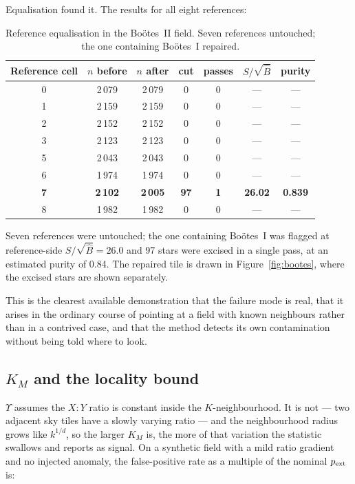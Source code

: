 \documentclass[11pt,a4paper]{article}
\newcommand{\Ups}{\Upsilon}                  %
\newcommand{\Ups}{\Upsilon}
\newcommand{\Bhat}{\hat{B}}
\newcommand{\srb}{S/\sqrt{\Bhat}}
\begin{document}
Equalisation found it. The results for all eight references:

\begin{table}[h]
\centering\small
\caption{Reference equalisation in the Bo\"otes~II field. Seven references untouched; the one
containing Bo\"otes~I repaired.}
\begin{tabular}{@{}ccccccc@{}}
\toprule
Reference cell & $n$ before & $n$ after & cut & passes & $\srb$ & purity\\
\midrule
0 & 2\,079 & 2\,079 & 0 & 0 & --- & ---\\
1 & 2\,159 & 2\,159 & 0 & 0 & --- & ---\\
2 & 2\,152 & 2\,152 & 0 & 0 & --- & ---\\
3 & 2\,123 & 2\,123 & 0 & 0 & --- & ---\\
5 & 2\,043 & 2\,043 & 0 & 0 & --- & ---\\
6 & 1\,974 & 1\,974 & 0 & 0 & --- & ---\\
\textbf{7} & \textbf{2\,102} & \textbf{2\,005} & \textbf{97} & \textbf{1} & \textbf{26.02} &
\textbf{0.839}\\
8 & 1\,982 & 1\,982 & 0 & 0 & --- & ---\\
\bottomrule
\end{tabular}
\end{table}

Seven references were untouched; the one containing Bo\"otes~I was flagged at reference-side
$\srb = 26.0$ and 97 stars were excised in a single pass, at an estimated purity of 0.84. The
repaired tile is drawn in Figure~\ref{fig:bootes}, where the excised stars are shown separately.

This is the clearest available demonstration that the failure mode is real, that it arises in the
ordinary course of pointing at a field with known neighbours rather than in a contrived case, and
that the method detects its own contamination without being told where to look.

\subsection{$K_M$ and the locality bound}
\label{sec:km}

$\Ups$ assumes the $X\!:\!Y$ ratio is constant inside the $K$-neighbourhood. It is not --- two
adjacent sky tiles have a slowly varying ratio --- and the neighbourhood radius grows like
$k^{1/d}$, so the larger $K_M$ is, the more of that variation the statistic swallows and reports as
signal. On a synthetic field with a mild ratio gradient and no injected anomaly, the false-positive
rate as a multiple of the nominal $p_{\rm ext}$ is:
\end{document}
